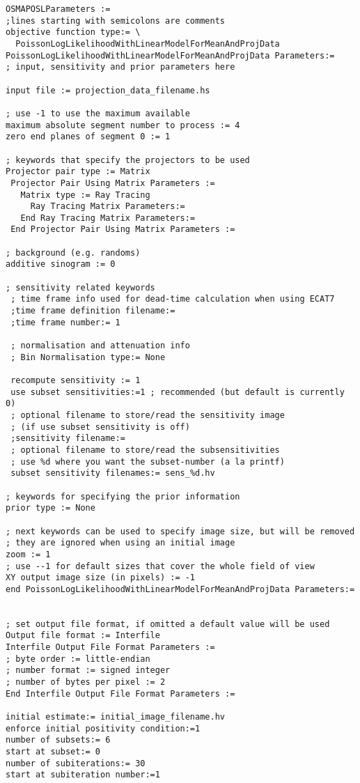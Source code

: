 \documentclass{article}
\begin{document}
\begin{verbatim}
OSMAPOSLParameters :=
;lines starting with semicolons are comments
objective function type:= \
  PoissonLogLikelihoodWithLinearModelForMeanAndProjData
PoissonLogLikelihoodWithLinearModelForMeanAndProjData Parameters:=
; input, sensitivity and prior parameters here

input file := projection_data_filename.hs

; use -1 to use the maximum available
maximum absolute segment number to process := 4
zero end planes of segment 0 := 1

; keywords that specify the projectors to be used
Projector pair type := Matrix 
 Projector Pair Using Matrix Parameters := 
   Matrix type := Ray Tracing
     Ray Tracing Matrix Parameters:=
   End Ray Tracing Matrix Parameters:= 
 End Projector Pair Using Matrix Parameters :=

; background (e.g. randoms)
additive sinogram := 0

; sensitivity related keywords
 ; time frame info used for dead-time calculation when using ECAT7
 ;time frame definition filename:=
 ;time frame number:= 1

 ; normalisation and attenuation info
 ; Bin Normalisation type:= None
 
 recompute sensitivity := 1
 use subset sensitivities:=1 ; recommended (but default is currently 0)
 ; optional filename to store/read the sensitivity image 
 ; (if use subset sensitivity is off)
 ;sensitivity filename:=
 ; optional filename to store/read the subsensitivities
 ; use %d where you want the subset-number (a la printf)
 subset sensitivity filenames:= sens_%d.hv

; keywords for specifying the prior information
prior type := None

; next keywords can be used to specify image size, but will be removed
; they are ignored when using an initial image
zoom := 1
; use --1 for default sizes that cover the whole field of view
XY output image size (in pixels) := -1
end PoissonLogLikelihoodWithLinearModelForMeanAndProjData Parameters:=


; set output file format, if omitted a default value will be used
Output file format := Interfile 
Interfile Output File Format Parameters := 
; byte order := little-endian 
; number format := signed integer 
; number of bytes per pixel := 2 
End Interfile Output File Format Parameters :=

initial estimate:= initial_image_filename.hv
enforce initial positivity condition:=1
number of subsets:= 6
start at subset:= 0
number of subiterations:= 30
start at subiteration number:=1


\end{verbatim}
\end{document}

